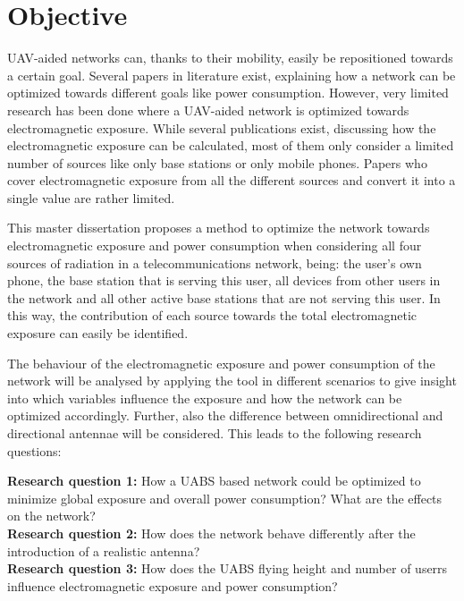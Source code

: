 \section{Objective}
\label{sec:objective}

\gls{UAV}-aided networks can, thanks to their mobility, easily be repositioned towards a certain goal. Several papers 
in literature exist, explaining how a network can be optimized towards different goals like power consumption.
However, very limited
research has been done where a \gls{UAV}-aided network is optimized towards electromagnetic exposure.
While several publications exist, discussing how the electromagnetic exposure can be calculated, most of them only consider a limited number of sources like only base stations or only mobile phones.
Papers who cover electromagnetic exposure from all the different sources and convert it into a single value are rather limited.

This master dissertation proposes a method to optimize the network towards electromagnetic exposure and power consumption
when considering all four sources of radiation in a telecommunications network, being: the user's own phone, 
the base station that is serving this user, 
all devices from other users in the network and all 
other active base stations that are not serving this user. In this way, the contribution of each source towards the total 
electromagnetic exposure can easily be identified. 

The behaviour of the electromagnetic exposure and power consumption of the network will be analysed by applying the tool in different scenarios 
to give insight into which variables influence the exposure and how
the network can be optimized accordingly. Further, also the difference between omnidirectional and directional antennae will 
be considered. This leads to the following research questions:

\textbf{Research question 1:} How a \gls{UABS} based network could be optimized to minimize global exposure and overall power consumption? 
What are the effects on the network?\\

\textbf{Research question 2:} How does the network behave differently after the introduction of a realistic antenna?\\

\textbf{Research question 3:} How does the \gls{UABS} flying height and number of userrs influence
electromagnetic exposure and power consumption?\\

